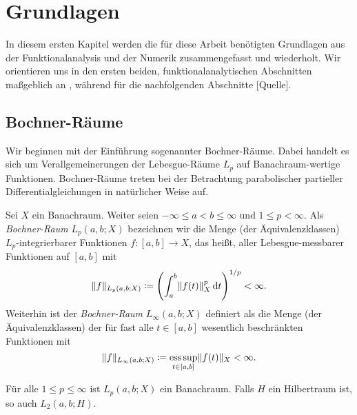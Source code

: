 
\chapter{Grundlagen} %
\label{cha:grundlagen}

In diesem ersten Kapitel werden die für diese Arbeit benötigten Grundlagen aus der Funktionalanalysis und der Numerik zusammengefasst und wiederholt.
Wir orientieren uns in den ersten beiden, funktionalanalytischen Abschnitten maßgeblich an \textcite{Dautray:1992by,Lions:1972tg}, während für die nachfolgenden Abschnitte [Quelle].

\section{Bochner-Räume} %
\label{sec:bochner_r_ume}

Wir beginnen mit der Einführung sogenannter Bochner-Räume.
Dabei handelt es sich um Verallgemeinerungen der Lebesgue-Räume $L_{p}$ auf Banachraum-wertige Funktionen.
Bochner-Räume treten bei der Betrachtung parabolischer partieller Differentialgleichungen in natürlicher Weise auf.

\begin{Definition}
\label{definition:gl:bochner_raum}
    Sei $X$ ein Banachraum.
    Weiter seien $- \infty \leq a < b \leq \infty$ und $1 \leq p < \infty$.
    Als \emph{Bochner-Raum} $L_{p}(a, b; X)$ bezeichnen wir die Menge (der Äquivalenzklassen) $L_{p}$-integrierbarer Funktionen $f \colon [a, b] \to X$, das heißt, aller Lebesgue-messbarer Funktionen auf $[a, b]$ mit
    \begin{equation}
        \lVert f\rVert_{L_{p}(a, b; X)} \coloneqq \left( \int_{a}^{b} \lVert f(t)\rVert_{X}^{p} \mathop{}\!\mathrm{d} t \right)^{1 / p} < \infty.
    \end{equation}
    Weiterhin ist der \emph{Bochner-Raum} $L_{\infty}(a, b; X)$ definiert als die Menge (der Äquivalenzklassen) der für fast alle $t \in [a, b]$ wesentlich beschränkten Funktionen mit
    \begin{equation}
        \lVert f\rVert_{L_{\infty}(a, b; X)} \coloneqq \operatorname*{ess\,sup}_{t \in [a, b]} \lVert f(t)\rVert_{X} < \infty.
    \end{equation}
\end{Definition}

\begin{Lemma}
\label{lemma:gl:bochner_ist_banach}
    Für alle $1 \leq p \leq \infty$ ist $L_{p}(a, b; X)$ ein Banachraum.
    Falls $H$ ein Hilbertraum ist, so auch $L_{2}(a, b; H)$.
\end{Lemma}

